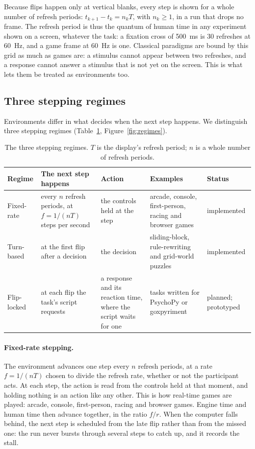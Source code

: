 Because flips happen only at vertical blanks, every step is shown for a whole number of refresh periods: $t_{k+1} - t_k = n_k T$, with $n_k \ge 1$, in a run that drops no frame.
The refresh period is thus the quantum of human time in any experiment shown on a screen, whatever the task: a fixation cross of 500~ms is 30 refreshes at 60~Hz, and a game frame at 60~Hz is one.
Classical paradigms are bound by this grid as much as games are: a stimulus cannot appear between two refreshes, and a response cannot answer a stimulus that is not yet on the screen.
This is what lets them be treated as environments too.

\subsection{Three stepping regimes}
\label{sec:regimes}

Environments differ in what decides when the next step happens.
We distinguish three stepping regimes (Table~\ref{tab:regimes}, Figure~\ref{fig:regimes}).

\begin{table}[t]
  \centering
  \small
  \caption{The three stepping regimes. $T$ is the display's refresh period; $n$ is a whole number of refresh periods.}
  \label{tab:regimes}
  \begin{tabularx}{\textwidth}{@{}l>{\raggedright\arraybackslash}X>{\raggedright\arraybackslash}X>{\raggedright\arraybackslash}X>{\raggedright\arraybackslash}p{2.2cm}@{}}
    \toprule
    Regime & The next step happens & Action & Examples & Status \\
    \midrule
    Fixed-rate & every $n$ refresh periods, at $f = 1/(nT)$ steps per second & the controls held at the step & arcade, console, first-person, racing and browser games & implemented \\
    Turn-based & at the first flip after a decision & the decision & sliding-block, rule-rewriting and grid-world puzzles & implemented \\
    Flip-locked & at each flip the task's script requests & a response and its reaction time, where the script waits for one & tasks written for PsychoPy or goxpyriment & planned; prototyped \\
    \bottomrule
  \end{tabularx}
\end{table}

\paragraph{Fixed-rate stepping.}
The environment advances one step every $n$ refresh periods, at a rate $f = 1/(nT)$ chosen to divide the refresh rate, whether or not the participant acts.
At each step, the action is read from the controls held at that moment, and holding nothing is an action like any other.
This is how real-time games are played: arcade, console, first-person, racing and browser games.
Engine time and human time then advance together, in the ratio $f/r$.
When the computer falls behind, the next step is scheduled from the late flip rather than from the missed one: the run never bursts through several steps to catch up, and it records the stall.

